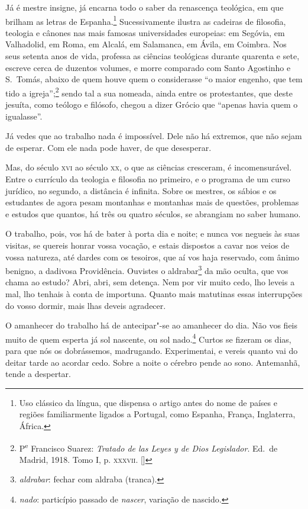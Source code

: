 Já é mestre insigne, já encarna todo o saber da renascença
teológica, em que brilham as letras de Espanha.\footnote{Uso clássico da língua, que dispensa o artigo antes do nome de países e
regiões familiarmente ligados a Portugal, como Espanha, França,
Inglaterra, África.}
Sucessivamente ilustra as cadeiras de filosofia, teologia e
cânones nas mais famosas
universidades europeias: em Segóvia, em Valhadolid, em Roma, em
Alcalá, em Salamanca, em Ávila, em Coimbra. 
Nos seus setenta anos de vida, professa as ciências
teológicas durante quarenta e sete, escreve cerca de duzentos volumes,
e morre comparado com Santo Agostinho e S.~Tomás, abaixo de quem houve quem
o considerasse ``o maior engenho, que tem tido a
igreja'';\footnote{ P\textsuperscript{e} Francisco Suarez: \textit{Tratado
de las Leyes y de Dios Legislador}. Ed.~de Madrid, 1918. Tomo I, p.
\textsc{xxxvii}. []} sendo tal a sua nomeada, ainda entre os protestantes,
que deste jesuíta, como teólogo e filósofo, chegou a dizer
Grócio que ``apenas havia quem o igualasse''.

Já vedes que ao trabalho nada é impossível. Dele não há extremos,
que não sejam de esperar. Com ele nada pode haver, de que desesperar.

Mas, do século \textsc{xvi} ao século \textsc{xx}, o que as ciências cresceram, é
incomensurável. Entre o currículo da teologia e filosofia no primeiro,
e o programa de um curso jurídico, no segundo, a distância é infinita.
Sobre os mestres, os sábios e os estudantes de agora pesam montanhas e
montanhas mais de questões, problemas e estudos que quantos, há três ou
quatro séculos, se abrangiam no saber humano.

O trabalho, pois, vos há de bater à porta dia e noite; e nunca vos
negueis às suas visitas, se quereis honrar vossa vocação, e estais
dispostos a cavar nos veios de vossa natureza, até dardes com os
tesoiros, que aí vos haja reservado, com ânimo benigno, a dadivosa
Providência. Ouvistes o aldrabar\footnote{\textit{aldrabar}: fechar com aldraba (tranca).} da mão oculta, que vos chama
ao estudo? Abri, abri, sem detença. Nem por vir muito cedo, lho leveis
a mal, lho tenhais à conta de importuna. Quanto mais
matutinas essas interrupções do vosso dormir, mais lhas deveis agradecer.

O amanhecer do trabalho há de antecipar"-se ao amanhecer do dia.
Não vos fieis muito de quem esperta já sol nascente, ou sol
nado.\footnote{\emph{nado}: particípio passado de \textit{nascer}, variação de
nascido.} Curtos se fizeram os dias, para que nós os
dobrássemos, madrugando. Experimentai, e vereis quanto vai do deitar
tarde ao acordar cedo. Sobre a noite o cérebro pende ao sono.
Antemanhã, tende a despertar.

